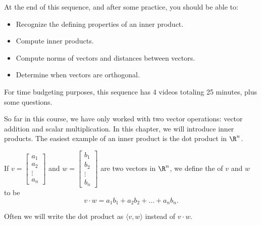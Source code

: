 







At the end of this sequence, and after some practice, you should be able to:

\begin{itemize}
\item Recognize the defining properties of an inner product.  
\item Compute inner products.  
\item Compute norms of vectors and distances between vectors.  
\item Determine when vectors are orthogonal.  
\end{itemize}


For time budgeting purposes, this sequence has 4 videos totaling 25 minutes, 
plus some questions.  




\endedxtext

\endedxvertical






So far in this course, we have only worked with two vector operations: vector addition and scalar 
multiplication.  In this chapter, we will introduce inner products.  The easiest example of an inner
product is the dot product in $\R^n$.  

{} If $v = \left[ \begin{array}{c} a_1 \\ a_2 \\ \vdots \\ a_n \end{array} \right]$
and $w = \left[ \begin{array}{c} b_1 \\ b_2 \\ \vdots \\ b_n \end{array} \right]$ are two vectors in
$\R^n$, we define the {} of $v$ and $w$ to be 
\[ v\cdot w = a_1b_1 + a_2b_2 + \ldots + a_nb_n. \]

Often we will write the dot product as $\langle v, w\rangle$ instead of $v\cdot w$.  

\endedxtext



